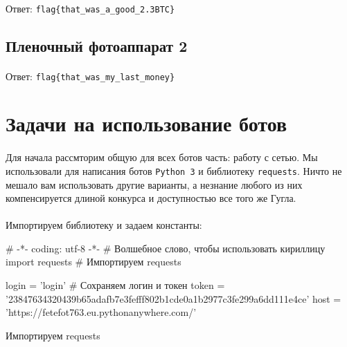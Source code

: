 \documentclass[12pt]{article}
\begin{document}
    \paragraph{}
    \paragraph{}
    Ответ: \verb|flag{that_was_a_good_2.3BTC}|

    \subsection{Пленочный фотоаппарат 2}
    \paragraph{}
    \paragraph{}
    Ответ: \verb|flag{that_was_my_last_money}|

    \newpage

    \section{Задачи на использование ботов}
	\paragraph{}
    Для начала рассмторим общую для всех ботов часть: работу с сетью.
	Мы использовали для написания ботов \verb|Python 3| и библиотеку \verb|requests|.
	Ничто не мешало вам использовать другие варианты,
	а незнание любого из них компенсируется длиной конкурса и доступностью все того же Гугла.
	\paragraph{}
    Импортируем библиотеку и задаем константы:
    \begin{listing}[H]
        \begin{pythoncode}
# -*- coding: utf-8 -*- # Волшебное слово, чтобы использовать кириллицу
import requests # Импортируем requests

login = 'login' # Сохраняем логин и токен
token = '23847634320439b65adafb7e3fefff802b1cde0a1b2977c3fe299a6dd111e4ce'
host = 'https://fetefot763.eu.pythonanywhere.com/'
        \end{pythoncode}
        \caption{Импортируем requests}
        \label{lst:import_requests}
    \end{listing}
\end{document}
